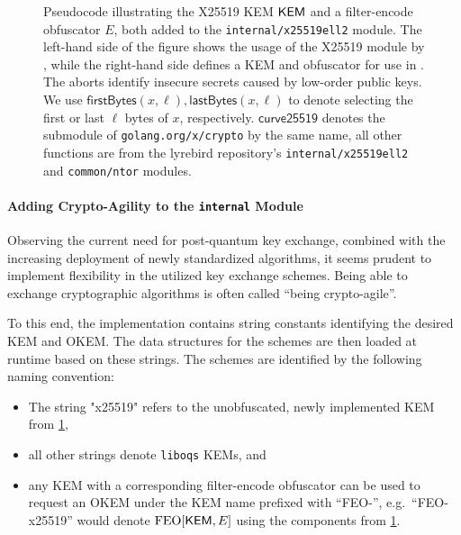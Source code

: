 \begin{figure}
    
    \caption[
        Pseudocode illustrating the X25519 KEM and filter-encode obfuscator added to the \texttt{internal/x25519ell2} module.
    ]{
        Pseudocode illustrating the X25519 KEM $\mathsf{KEM}$ and a filter-encode obfuscator $E$, both added to the \texttt{internal/x25519ell2} module.
        The left-hand side of the figure shows the usage of the X25519 module by \obfsfour{}, while the right-hand side defines a KEM and obfuscator for use in \drivel{}.
        The aborts identify insecure secrets caused by low-order public keys.
        We use $\mathsf{firstBytes}(x, \ell), \mathsf{lastBytes}(x, \ell)$ to denote selecting the first or last $\ell$ bytes of $x$, respectively.
        $\mathsf{curve25519}$ denotes the submodule of \texttt{golang.org/x/crypto} by the same name, all other functions are from the lyrebird repository's \texttt{internal/x25519ell2} and \texttt{common/ntor} modules.
    }
    \label{fig:impl-x25519-kem}
\end{figure}

\paragraph{Adding Crypto-Agility to the \texttt{internal} Module}

Observing the current need for post-quantum key exchange, combined with the increasing deployment of newly standardized algorithms, it seems prudent to implement flexibility in the utilized key exchange schemes. Being able to exchange cryptographic algorithms is often called ``being crypto-agile''.

To this end, the \drivel{} implementation contains string constants identifying the desired KEM and OKEM. The data structures for the schemes are then loaded at runtime based on these strings.
The schemes are identified by the following naming convention:
\begin{itemize}
    \item The string "x25519" refers to the unobfuscated, newly implemented KEM from \cref{fig:impl-x25519-kem},
    \item all other strings denote \texttt{liboqs} KEMs, and
    \item any KEM with a corresponding filter-encode obfuscator can be used to request an OKEM under the KEM name prefixed with ``FEO-'', e.g.~``FEO-x25519'' would denote $\textsf{\textnormal{FEO}}[\mathsf{KEM}, E]$ using the components from \cref{fig:impl-x25519-kem}.
\end{itemize}


